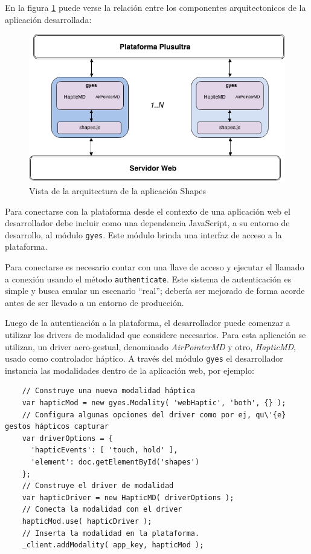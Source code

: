En la figura \ref{fig:demo_shapes_app_arq} puede verse la relación entre los componentes arquitectonicos de la aplicación desarrollada:

\begin{center}
  \begin{figure}[h]
    \includegraphics[scale=0.6]{gfx/shapes_app_arq}
    \caption{Vista de la arquitectura de la aplicación Shapes}
    \label{fig:demo_shapes_app_arq}
  \end{figure}
\end{center}


Para conectarse con la plataforma desde el contexto de una aplicación web el desarrollador debe incluir como una dependencia JavaScript, a su entorno de desarrollo, al módulo \texttt{gyes}. Este módulo brinda una interfaz de acceso a la plataforma.

Para conectarse es necesario contar con una llave de acceso y ejecutar el llamado a conexión usando el método \texttt{authenticate}. Este sistema de autenticación es simple y busca emular un escenario ``real''; debería ser mejorado de forma acorde antes de ser llevado a un entorno de producción.

Luego de la autenticación a la plataforma, el desarrollador puede comenzar a utilizar los drivers de modalidad que considere necesarios. Para esta aplicación se utilizan, un driver aero-gestual, denominado \emph{AirPointerMD} y otro, \emph{HapticMD}, usado como controlador háptico. A través del módulo \texttt{gyes} el desarrollador instancia las modalidades dentro de la aplicación web, por ejemplo:

\begin{lstlisting}
    // Construye una nueva modalidad háptica
    var hapticMod = new gyes.Modality( 'webHaptic', 'both', {} ); 
    // Configura algunas opciones del driver como por ej, qu\'{e} gestos hápticos capturar
    var driverOptions = {
      'hapticEvents': [ 'touch, hold' ],
      'element': doc.getElementById('shapes')
    };
    // Construye el driver de modalidad
    var hapticDriver = new HapticMD( driverOptions );
    // Conecta la modalidad con el driver
    hapticMod.use( hapticDriver );
    // Inserta la modalidad en la plataforma.
    _client.addModality( app_key, hapticMod );
\end{lstlisting}

